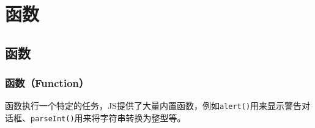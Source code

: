 \chapter{函数}

\section{函数}

\subsection{函数（Function）}

函数执行一个特定的任务，JS提供了大量内置函数，例如\lstinline|alert()|用来显示警告对话框、\lstinline|parseInt()|用来将字符串转换为整型等。


